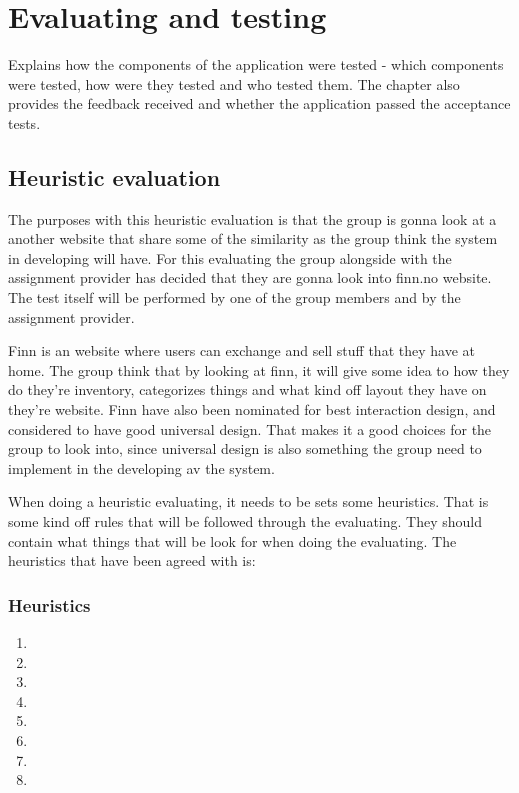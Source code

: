 \chapter{Evaluating and testing}
Explains how the components of the application were tested - which components were tested, how were they tested and who tested them.
The chapter also provides the feedback received and whether the application passed the acceptance tests.

\section{Heuristic evaluation}
The purposes with this heuristic evaluation is that the group is gonna look at a another website that share some of the similarity as the group think the system in developing will have. For this evaluating the group alongside with the assignment provider has decided that they are gonna look into finn.no website. The test itself will be performed by one of the group members and by the assignment provider.

Finn is an website where users can exchange and sell stuff that they have at home. The group think that by looking at finn, it will give some idea to how they do they're inventory, categorizes things and what kind off layout they have on they're website. Finn have also been nominated for best interaction design,
and considered to have good universal design.\cite{finn_nominert} %
That makes it a good choices for the group to look into, since universal design is also something the group need to implement in the developing av the system. 

When doing a heuristic evaluating, it needs to be sets some heuristics. That is some kind off rules that will be followed through the evaluating. They should contain what things that will be look for when doing the evaluating. The heuristics that have been agreed with is:

\subsection{Heuristics}
\begin{enumerate}
  \item 
  \item
  \item
  \item
  \item
  \item
  \item
  \item
 \end{enumerate}

